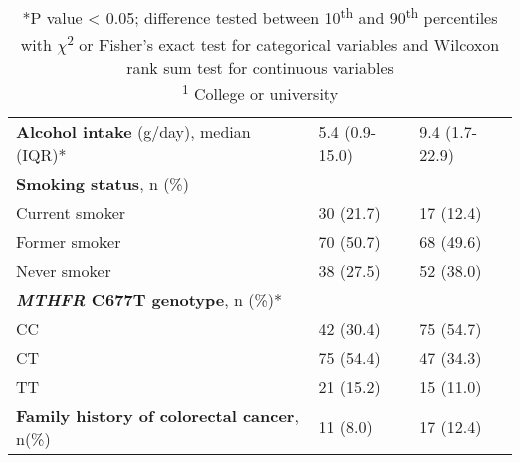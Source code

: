\begin{center}
\begin{table}
\begin{adjustbox}{width=\textwidth}
\begin{tabular}{L{7.2cm}L{4.0cm}L{3.6cm}}
\textbf{Alcohol intake} (g/day), median (IQR)*& 5.4 (0.9-15.0) & 9.4 (1.7-22.9)\\
\textbf{Smoking status}, n (\%) &~ &~\\ \quad Current smoker & 30 (21.7) & 17 (12.4)\\ \quad Former smoker & 70 (50.7) & 68 (49.6)\\ \quad Never smoker & 38 (27.5) & 52 (38.0)\\
 \textbf{\textit{MTHFR} C677T genotype}, n (\%)* &~ &~\\ \quad CC & 42 (30.4) & 75 (54.7)\\ \quad CT & 75 (54.4) & 47 (34.3)\\ \quad TT & 21 (15.2) & 15 (11.0)\\
 \textbf{Family history of colorectal cancer}, n(\%) & 11 (8.0) & 17 (12.4)\\\hline 
\end{tabular}
\end{adjustbox}
\caption*{\footnotesize{*P value < 0.05; difference tested between 10\textsuperscript{th} and 90\textsuperscript{th} percentiles with $\chi$\textsuperscript{2} or Fisher's exact test for categorical variables and Wilcoxon rank sum test for continuous variables \\ \textsuperscript{1} College or university}}
\end{table}
\end{center}



